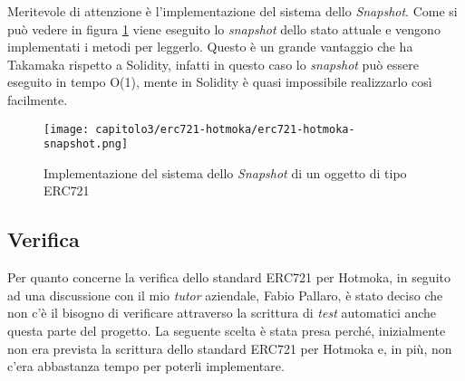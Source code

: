 
Meritevole di attenzione è l'implementazione del sistema dello \textit{Snapshot}. Come si può vedere in figura \ref{fig:erc721-snapshot} viene eseguito lo \textit{snapshot} dello stato attuale e vengono implementati i metodi per leggerlo. Questo è un grande vantaggio che ha Takamaka rispetto a Solidity, infatti in questo caso lo \textit{snapshot} può essere eseguito in tempo O(1), mente in Solidity è quasi impossibile realizzarlo così facilmente.

\begin{figure}[h!]
  \centering
  \texttt{[image: capitolo3/erc721-hotmoka/erc721-hotmoka-snapshot.png]}
  \caption{Implementazione del sistema dello \textit{Snapshot} di un oggetto di tipo ERC721}
  \label{fig:erc721-snapshot}
\end{figure}


\subsection{Verifica}
Per quanto concerne la verifica dello standard ERC721 per Hotmoka, in seguito ad una discussione con il mio \textit{tutor} aziendale, Fabio Pallaro, è stato deciso che non c'è il bisogno di verificare attraverso la scrittura di \textit{test} automatici anche questa parte del progetto. La seguente scelta è stata presa perché, inizialmente non era prevista la scrittura dello standard ERC721 per Hotmoka e, in più, non c'era abbastanza tempo per poterli implementare.
